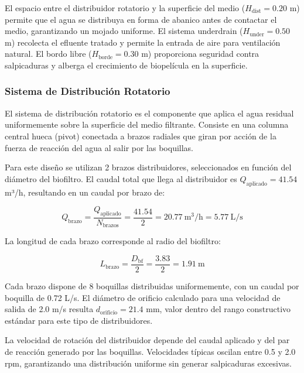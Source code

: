 \documentclass[12pt,a4paper]{article}
\begin{document}
El espacio entre el distribuidor rotatorio y la superficie del medio ($H_{\text{dist}} = 0.20$ m) permite que el agua se distribuya en forma de abanico antes de contactar el medio, garantizando un mojado uniforme. El sistema underdrain ($H_{\text{under}} = 0.50$ m) recolecta el efluente tratado y permite la entrada de aire para ventilación natural. El bordo libre ($H_{\text{borde}} = 0.30$ m) proporciona seguridad contra salpicaduras y alberga el crecimiento de biopelícula en la superficie.

\subsubsection*{Sistema de Distribución Rotatorio}

El sistema de distribución rotatorio es el componente que aplica el agua residual uniformemente sobre la superficie del medio filtrante. Consiste en una columna central hueca (pivot) conectada a brazos radiales que giran por acción de la fuerza de reacción del agua al salir por las boquillas.

Para este diseño se utilizan 2 brazos distribuidores, seleccionados en función del diámetro del biofiltro. El caudal total que llega al distribuidor es $Q_{\text{aplicado}} = 41.54$ m³/h, resultando en un caudal por brazo de:

\begin{equation}
Q_{\text{brazo}} = \frac{Q_{\text{aplicado}}}{N_{\text{brazos}}} = \frac{41.54}{2} = 20.77\ \text{m}^3\text{/h} = 5.77\ \text{L/s}
\end{equation}

La longitud de cada brazo corresponde al radio del biofiltro:

\begin{equation}
L_{\text{brazo}} = \frac{D_{\text{bf}}}{2} = \frac{3.83}{2} = 1.91\ \text{m}
\end{equation}

Cada brazo dispone de 8 boquillas distribuidas uniformemente, con un caudal por boquilla de 0.72 L/s. El diámetro de orificio calculado para una velocidad de salida de 2.0 m/s resulta $d_{\text{orificio}} = 21.4$ mm, valor dentro del rango constructivo estándar para este tipo de distribuidores.

La velocidad de rotación del distribuidor depende del caudal aplicado y del par de reacción generado por las boquillas. Velocidades típicas oscilan entre 0.5 y 2.0 rpm, garantizando una distribución uniforme sin generar salpicaduras excesivas.
\end{document}
